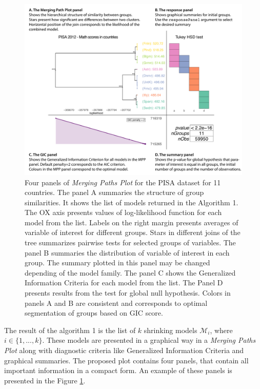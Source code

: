 \documentclass[12pt]{article}
\begin{document}
\begin{figure}[h!tbp]
\centering
\includegraphics[width=\textwidth]{FM_tukey_done}
\caption{\label{fig:PISAtree}Four panels of \emph{Merging Paths Plot} for the PISA dataset for 11 countries. The panel A summaries the structure of group similarities. It shows the list of  models returned in the Algorithm 1. The OX axis presents values of log-likelihood function for each model from the list. Labels on the right margin presents averages of variable of interest for different groups. Stars in different joins of the tree summarizes pairwise tests for selected groups of variables. The panel B summaries the distribution of variable of interest in each group. The summary plotted in this panel may be changed depending of the model family. The panel C shows the Generalized Information Criteria for each model from the list. The Panel D presents results from the test for global null hypothesis. Colors in panels A and B are consistent and corresponds to optimal segmentation of groups based on GIC score.}
\end{figure}

\clearpage

The result of the algorithm 1 is the list of $k$ shrinking models $\mathcal{M}_i$, where $i \in \{1, ..., k\}$. These models are presented in a graphical way in a \emph{Merging Paths Plot} along with diagnostic criteria like Generalized Information Criteria  and graphical  summaries. 
The proposed plot contains four panels, that contain all important information in a compact form.
An example of these panels is presented in the Figure \ref{fig:PISAtree}.
\end{document}
